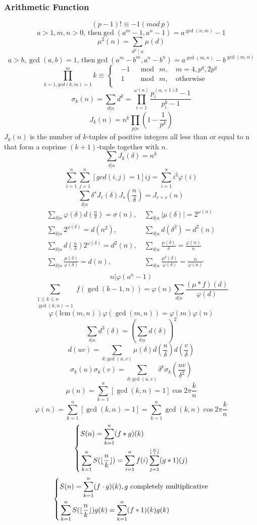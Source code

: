 \begin{footnotesize}
\subsubsection{Arithmetic Function}
\[(p-1)!\equiv-1(mod\ p)\]
\[a>1,m,n>0 \text{, then} \gcd(a^m-1,a^n-1)=a^{\gcd(n,m)}-1\]
\[ \mu^2(n) = \sum_{d^2 \mid n} \mu (d) \]
\[a>b,\gcd(a,b)=1 \text{, then} \gcd(a^m-b^m,a^n-b^n)=a^{\gcd(m,n)}-b^{\gcd(m,n)}\]
\[ \prod_{k=1,gcd(k, m) = 1}^{m} k \equiv \left\{
\begin{aligned}
&-1 & \mod\ m,\ & m = 4, p^q, 2p^q \\
&1 & \mod\ m,\ & \text{otherwise} \\
\end{aligned}
\right.
\]
\[ \sigma_k(n) = \sum_{d|n}d^k = \prod_{i=1}^{\omega(n)}\frac{p_i^{(a_i+1)k}-1}
{p_i^k-1} \]
\[ J_k(n) = n^k\prod_{p|n}(1-\frac{1}{p^k}) \]
$J_k(n)$ is the number of $k$-tuples of positive integers all less than or equal to n that form a coprime $(k + 1)$-tuple together with $n$.
\[ \sum_{\delta|n}J_k(\delta) = n^k \]
\[ \sum_{i=1}^{n} \sum_{j=1}^{n} [gcd(i,j)=1]ij =  \sum_{i=1}^{n} i^2\varphi(i) \]
\[ \sum_{\delta|n}\delta^sJ_r(\delta)J_s(\frac{n}{\delta}) = J_{r+s}(n) \]
\begin{align*}
\sum_{\delta|n}\varphi(\delta)d(\frac{n}{\delta}) = \sigma(n),&\ \sum_{\delta|n}\left| \mu(\delta) \right| = 2^{\omega(n)} \\
\sum_{\delta|n}2^{\omega(\delta)} = d(n^2),&\ \sum_{\delta|n}d(\delta^2) = d^2(n) \\
\sum_{\delta|n}d(\frac{n}{\delta})2^{\omega(\delta)} = d^2(n),&\ \sum_{\delta|n}\frac{\mu(\delta)}{\delta} = \frac{\varphi(n)}{n} \\
\sum_{\delta|n}\frac{\mu(\delta)}{\varphi(\delta)} = d(n),&\ \sum_{\delta|n}\frac{\mu^2(\delta)}{\varphi(\delta)} = \frac{n}{\varphi(n)} \\
\end{align*}
\[ n|\varphi(a^n-1) \]
\[ \sum_{\substack{1 \leq k \leq n \\ \gcd(k, n) = 1}}f(\gcd(k-1, n)) = \varphi(n)
\sum_{d|n}\frac{(\mu*f)(d)}{\varphi(d)} \]
\[ \varphi(\mathrm{lcm}(m, n))\varphi(\gcd(m,n)) = \varphi(m)\varphi(n) \]
\[ \sum_{\delta|n}d^3(\delta) = (\sum_{\delta|n}d(\delta))^2 \]
\[ d(uv) = \sum_{\delta|\gcd(u, v)}\mu(\delta)d(\frac{u}{\delta})d(\frac{v}{\delta}) \]
\[ \sigma_k(u)\sigma_k(v) = \sum_{\delta|\gcd(u, v)}\delta^k\sigma_k(\frac{uv}{\delta^2}) \]
\[ \mu(n) = \sum_{k=1}^n[\gcd(k, n)=1]\cos{2\pi \frac{k}{n}} \]
\[ \varphi(n) = \sum_{k=1}^n[\gcd(k, n)=1] = \sum_{k=1}^n\gcd(k, n)\cos{2\pi \frac{k}{n}} \]
\[
\left\{
\begin{aligned}
&S(n) = \sum_{k=1}^n(f \ast g)(k) \\
&\sum_{k=1}^nS(\lfloor {n \over k} \rfloor) = \sum_{i=1}^nf(i)\sum_{j=1}^{\lfloor{n \over i}\rfloor}(g \ast 1)(j)
\end{aligned}
\right.
\]
\[
\left\{
\begin{aligned}
&S(n) = \sum_{k=1}^n(f \cdot g)(k), g \text{ completely multiplicative} \\
&\sum_{k=1}^nS(\lfloor {n \over k} \rfloor)g(k) = \sum_{k=1}^n(f \ast 1)(k)g(k)
\end{aligned}
\right.
\]

\end{footnotesize}
